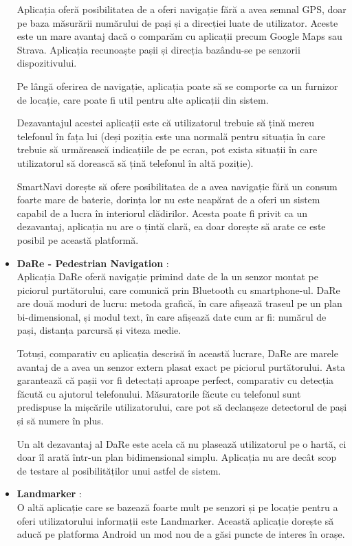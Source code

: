 \documentclass[12pt, a4paper, oneside]{article}
\begin{document}
\begin{itemize}
Aplicația oferă posibilitatea de a oferi navigație fără a avea semnal GPS, doar pe baza măsurării numărului de pași și a direcției luate de utilizator. Aceste este un mare avantaj dacă o comparăm cu aplicații precum Google Maps sau Strava. Aplicația recunoaște pașii și direcția bazându-se pe senzorii dispozitivului. 

Pe lângă oferirea de navigație, aplicația poate să se comporte ca un furnizor de locație, care poate fi util pentru alte aplicații din sistem. 

Dezavantajul acestei aplicații este că utilizatorul trebuie să țină mereu telefonul în fața lui (deși poziția este una normală pentru situația în care trebuie să urmărească indicațiile de pe ecran, pot exista situații în care utilizatorul să dorească să țină telefonul în altă poziție).

SmartNavi dorește să ofere posibilitatea de a avea navigație fără un consum foarte mare de baterie, dorința lor nu este neapărat de a oferi un sistem capabil de a lucra în interiorul clădirilor. Acesta poate fi privit ca un dezavantaj, aplicația nu are o țintă clară, ea doar dorește să arate ce este posibil pe această platformă.

\item \textbf{DaRe - Pedestrian Navigation} \cite{DaRe}:\\
Aplicația DaRe oferă navigație primind date de la un senzor montat pe piciorul purtătorului, care comunică prin Bluetooth cu smartphone-ul. DaRe are două moduri de lucru: metoda grafică, în care afișează traseul pe un plan bi-dimensional, și modul text, în care afișează date cum ar fi: numărul de pași, distanța parcursă și viteza medie. 

Totuși, comparativ cu aplicația descrisă în această lucrare, DaRe are marele avantaj de a avea un senzor extern plasat exact pe piciorul purtătorului. Asta garantează că pașii vor fi detectați aproape perfect, comparativ cu detecția făcută cu ajutorul telefonului. Măsuratorile făcute cu telefonul sunt predispuse la mișcările utilizatorului, care pot să declanșeze detectorul de pași și să numere în plus.

Un alt dezavantaj al DaRe este acela că nu plasează utilizatorul pe o hartă, ci doar îl arată într-un plan bidimensional simplu. Aplicația nu are decât scop de testare al posibilităților unui astfel de sistem.

\item \textbf{Landmarker} \cite{Landmarker}:\\
O altă aplicație care se bazează foarte mult pe senzori și pe locație pentru a oferi utilizatorului informații este Landmarker. Această aplicație dorește să aducă pe platforma Android un mod nou de a găsi puncte de interes în orașe. 


\end{itemize}
\end{document}
